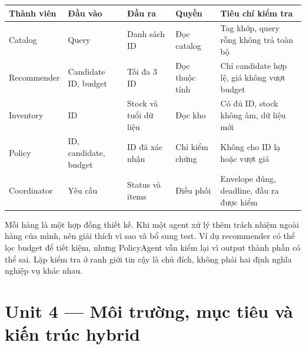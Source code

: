 {\def\LTcaptype{none} %
\begin{longtable}[]{@{}
  >{\raggedright\arraybackslash}p{}
  >{\raggedright\arraybackslash}p{}
  >{\raggedright\arraybackslash}p{}
  >{\raggedright\arraybackslash}p{}
  >{\raggedright\arraybackslash}p{}@{}}
\toprule\noalign{}
\begin{minipage}[b]{\linewidth}\raggedright
Thành viên
\end{minipage} & \begin{minipage}[b]{\linewidth}\raggedright
Đầu vào
\end{minipage} & \begin{minipage}[b]{\linewidth}\raggedright
Đầu ra
\end{minipage} & \begin{minipage}[b]{\linewidth}\raggedright
Quyền
\end{minipage} & \begin{minipage}[b]{\linewidth}\raggedright
Tiêu chí kiểm tra
\end{minipage} \\
\midrule\noalign{}
\endhead
\bottomrule\noalign{}
\endlastfoot
Catalog & Query & Danh sách ID & Đọc catalog & Tag khớp, query rỗng
không trả toàn bộ \\
Recommender & Candidate ID, budget & Tối đa 3 ID & Đọc thuộc tính & Chỉ
candidate hợp lệ, giá không vượt budget \\
Inventory & ID & Stock và tuổi dữ liệu & Đọc kho & Có đủ ID, stock không
âm, dữ liệu mới \\
Policy & ID, candidate, budget & ID đã xác nhận & Chỉ kiểm chứng & Không
cho ID lạ hoặc vượt giá \\
Coordinator & Yêu cầu & Status và items & Điều phối & Envelope đúng,
deadline, đầu ra được kiểm \\
\end{longtable}
}

Mỗi hàng là một hợp đồng thiết kế. Khi một agent xử lý thêm trách nhiệm
ngoài hàng của mình, nên giải thích vì sao và bổ sung test. Ví dụ
recommender có thể lọc budget để tiết kiệm, nhưng PolicyAgent vẫn kiểm
lại vì output thành phần có thể sai. Lặp kiểm tra ở ranh giới tin cậy là
chủ đích, không phải hai định nghĩa nghiệp vụ khác nhau.

\section{Unit 4 --- Môi trường, mục tiêu và kiến trúc
hybrid}\label{unit-4-muxf4i-trux1b0ux1eddng-mux1ee5c-tiuxeau-vuxe0-kiux1ebfn-truxfac-hybrid}

